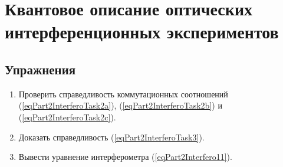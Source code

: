\chapter{Квантовое описание оптических интерференционных экспериментов}
\label{chInterfero}





\section{Упражнения}
\begin{enumerate}
\item Проверить справедливость коммутационных соотношений
  (\ref{eqPart2InterferoTask2a}), (\ref{eqPart2InterferoTask2b}) и
  (\ref{eqPart2InterferoTask2c}). 
\item Доказать справедливость (\ref{eqPart2InterferoTask3}).
\item Вывести уравнение интерферометра (\ref{eqPart2Interfero11}).
\end{enumerate}

